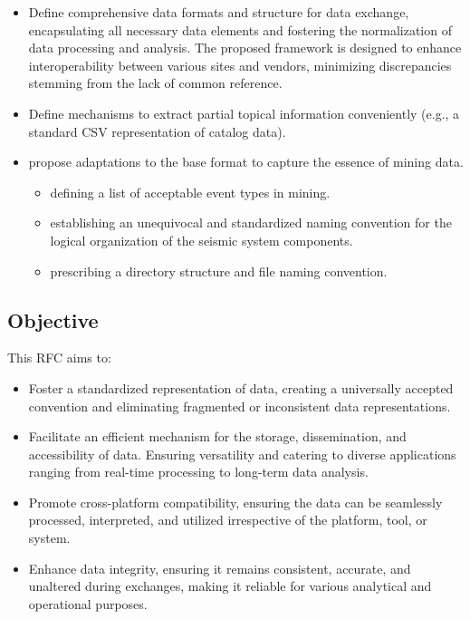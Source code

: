 \begin{itemize}
    \item Define comprehensive data formats and structure for \museismic data exchange, encapsulating all necessary data elements and fostering the normalization of data processing and analysis. The proposed framework is designed to enhance interoperability between various sites and vendors, minimizing discrepancies stemming from the lack of common reference.
    \item Define mechanisms to extract partial topical information conveniently (e.g., a standard CSV representation of catalog data).
    \item propose adaptations to the base format to capture the essence of mining data.
    \begin{itemize}
        \item defining a list of acceptable event types in mining.
        \item establishing an unequivocal and standardized naming convention for the logical organization of the seismic system components.
        \item prescribing a directory structure and file naming convention.
    \end{itemize}
\end{itemize} 

\subsection{Objective}

This RFC aims to:

\begin{itemize}
    \item Foster a standardized representation of \museismic data, creating a universally accepted convention and eliminating fragmented or inconsistent data representations.
    \item Facilitate an efficient mechanism for the storage, dissemination, and accessibility of \museismic data. Ensuring versatility and catering to diverse applications ranging from real-time processing to long-term data analysis.
    \item Promote cross-platform compatibility, ensuring the data can be seamlessly processed, interpreted, and utilized irrespective of the platform, tool, or system.
    \item Enhance data integrity, ensuring it remains consistent, accurate, and unaltered during exchanges, making it reliable for various analytical and operational purposes.
\end{itemize}

